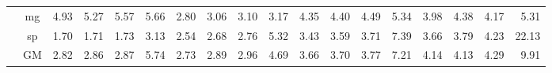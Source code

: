\begin{table*}[]
\begin{center}
{\begin{tabular}{|c|c|rrrr|rrrr|rrrr|rrrr|}
 &  mg  &  4.93  &  5.27  &  5.57  &   5.66  &  2.80  &  3.06  &  3.10  &  3.17  &  4.35  &  4.40  &  4.49  &   5.34  &  3.98  &  4.38  & \cellcolor{blue!25} 4.17  &   5.31 \\
 &  sp  &  1.70  &  1.71  &  1.73  &   3.13  &  2.54  &  2.68  &  2.76  &  5.32  &  3.43  &  3.59  &  3.71  &   7.39  &  3.66  &  3.79  &  4.23  &  22.13 \\
 &  GM  &  2.82  &  2.86  &  2.87  &   5.74  &  2.73  &  2.89  &  2.96  &  4.69  &  3.66  &  3.70  &  3.77  &   7.21  &  4.14  & \cellcolor{blue!25} 4.13  &  4.29  &   9.91 \\
\hline 
\end{tabular} }

\end{center}
\end{table*}
